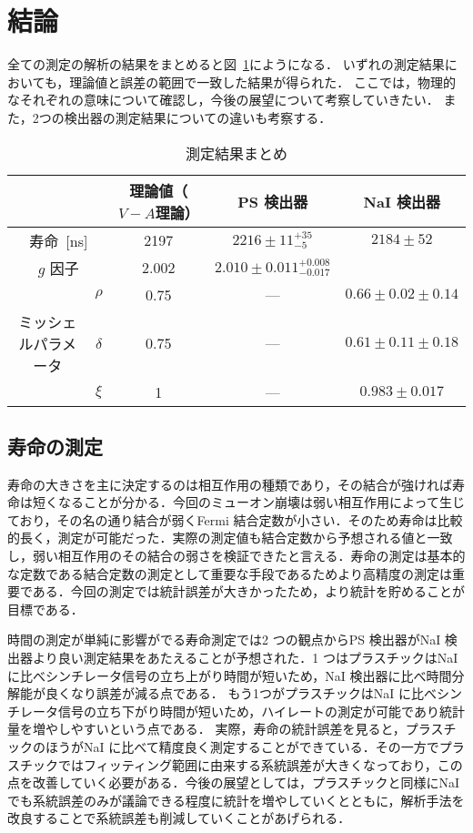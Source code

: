 \section{結論}
全ての測定の解析の結果をまとめると図~\ref{tab:result_conclusion}にようになる．
いずれの測定結果においても，理論値と誤差の範囲で一致した結果が得られた．
ここでは，物理的なそれぞれの意味について確認し，今後の展望について考察していきたい．
また，2つの検出器の測定結果についての違いも考察する．

\begin{table}[h]
\centering
\caption{測定結果まとめ}
\label{tab:result_conclusion}
\begin{tabular}{ccccc}\toprule
{} & {} & 理論値（$V-A$理論） & PS 検出器 & NaI 検出器\\ \midrule
\multicolumn{2}{c}{寿命~[ns]} &  2197 & $2216 \pm 11^{+35}_{- 5}$ & $2184 \pm 52$\\
\multicolumn{2}{c}{$g$ 因子} & 2.002 & $2.010 \pm 0.011^{+0.008}_{-0.017}$ & {}\\ %
{} & $\rho$ & 0.75 & --- & $0.66 \pm 0.02 \pm 0.14$\\
ミッシェルパラメータ & $\delta$ & 0.75 & --- & $0.61 \pm 0.11 \pm 0.18$\\
{} & $\xi$ & 1 & --- & $0.983 \pm 0.017$\\ \bottomrule
\end{tabular}
\end{table}%

\subsection{寿命の測定}
寿命の大きさを主に決定するのは相互作用の種類であり，その結合が強ければ寿命は短くなることが分かる．今回のミューオン崩壊は弱い相互作用によって生じており，その名の通り結合が弱くFermi 結合定数が小さい．そのため寿命は比較的長く，測定が可能だった．実際の測定値も結合定数から予想される値と一致し，弱い相互作用のその結合の弱さを検証できたと言える．寿命の測定は基本的な定数である結合定数の測定として重要な手段であるためより高精度の測定は重要である．今回の測定では統計誤差が大きかったため，より統計を貯めることが目標である．

時間の測定が単純に影響がでる寿命測定では2 つの観点からPS 検出器がNaI 検出器より良い測定結果をあたえることが予想された．1 つはプラスチックはNaI に比べシンチレータ信号の立ち上がり時間が短いため，NaI 検出器に比べ時間分解能が良くなり誤差が減る点である．
もう1つがプラスチックはNaI に比べシンチレータ信号の立ち下がり時間が短いため，ハイレートの測定が可能であり統計量を増やしやすいという点である．
実際，寿命の統計誤差を見ると，プラスチックのほうがNaI に比べて精度良く測定することができている．その一方でプラスチックではフィッティング範囲に由来する系統誤差が大きくなっており，この点を改善していく必要がある．今後の展望としては，プラスチックと同様にNaI でも系統誤差のみが議論できる程度に統計を増やしていくとともに，解析手法を改良することで系統誤差も削減していくことがあげられる．

